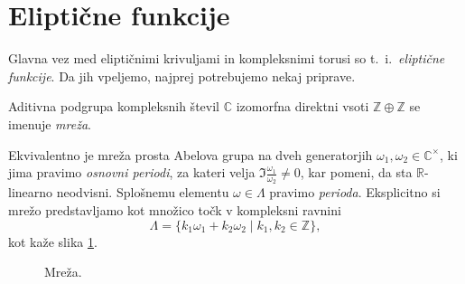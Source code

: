 \documentclass[mat1]{fmfdelo}
\newcommand{\R}{\mathbb R}
\newcommand{\Z}{\mathbb Z}
\newcommand{\C}{\mathbb C}
\newcommand{\CM}{\mathbb C ^\times}
\theoremstyle{definition}
\begin{document}
\section{Eliptične funkcije} \label{elipticne funkcije}

Glavna vez med eliptičnimi krivuljami in kompleksnimi torusi so t.~i.\ \emph{eliptične funkcije}. Da jih vpeljemo, najprej potrebujemo nekaj priprave.

\begin{definicija}
    Aditivna podgrupa kompleksnih števil $\C$ izomorfna direktni vsoti $\Z \oplus \Z$ se imenuje \emph{mreža}. 
\end{definicija}
    
Ekvivalentno je mreža prosta Abelova grupa na dveh generatorjih $\omega_1, \omega_2 \in \CM$, ki jima pravimo \emph{osnovni periodi}, za kateri velja $\Im \frac{\omega_1}{\omega_2} \neq 0$, kar pomeni, da sta $\R$-linearno neodvisni. Splošnemu elementu $\omega \in \Lambda$ pravimo \emph{perioda}. Eksplicitno si mrežo predstavljamo kot množico točk v kompleksni ravnini
\[
    \Lambda = \{k_1 \omega_1 + k_2 \omega_2 \mid k_1, k_2 \in \Z\},  
\]
kot kaže slika \ref{mreza}.
\\

\begin{figure}
    \centering

    \caption{Mreža.}
    \label{mreza}
\end{figure}
\end{document}

